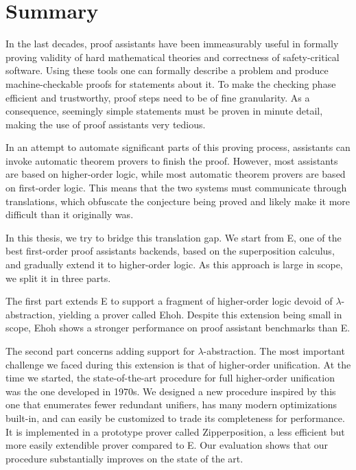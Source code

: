 \chapter*{Summary}

In the last decades, proof assistants have been immeasurably useful in formally
proving validity of hard mathematical theories and correctness of
safety-critical software. Using these tools one can formally describe a problem
and produce machine-checkable proofs for statements about it. To make the
checking phase efficient and trustworthy, proof steps need to be of fine
granularity. As a consequence, seemingly simple statements must be proven in
minute detail, making the use of proof assistants very tedious.

In an attempt to automate significant parts of this proving process, assistants
can invoke automatic theorem provers to finish the proof. However, most
assistants are based on higher-order logic, while most automatic theorem provers
are based on first-order logic. This means that the two systems must communicate
through translations, which obfuscate the conjecture being proved and likely make it more
difficult than it originally was.

In this thesis, we try to bridge this translation gap. We start from E, one of the best
first-order proof assistants backends, based on the superposition calculus, and
gradually extend it to higher-order logic. As this approach is large in scope,
we split it in three parts.

The first part extends E to support a fragment of higher-order logic devoid of
$\lambda$-abstra\-ction, yielding a prover called Ehoh. Despite this extension being small in scope, 
Ehoh shows a stronger performance on proof assistant benchmarks than E.

The second part concerns adding support for $\lambda$-abstraction. The most
important challenge we faced during this extension is that of higher-order
unification. At the time we started, the state-of-the-art procedure
for full higher-order unification was the one developed in 1970s. We designed a new
procedure inspired by this one that enumerates fewer redundant unifiers, has many
modern optimizations built-in, and can easily be customized to trade its
completeness for performance. It is implemented in a
prototype prover called Zipperposition, a less efficient but more easily extendible
prover compared to E. Our evaluation shows that our
procedure substantially improves on the state of the art.

